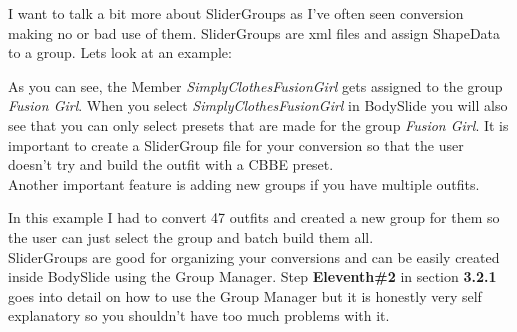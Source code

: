 I want to talk a bit more about SliderGroups as I've often seen conversion making no or bad use of them.
SliderGroups are xml files and assign ShapeData to a group. Lets look at an example:

As you can see, the Member \textit{SimplyClothesFusionGirl} gets assigned to the group \textit{Fusion Girl}. When you select 
\textit{SimplyClothesFusionGirl} in BodySlide you will also see that you can only select presets that are made for the group 
\textit{Fusion Girl}. It is important to create a SliderGroup file for your conversion so that the user doesn't try and 
build the outfit with a CBBE preset.\\
Another important feature is adding new groups if you have multiple outfits.

In this example I had to convert 47 outfits and created a new group for them so the user can just select the group and batch 
build them all.\\ SliderGroups are good for organizing your conversions and can be easily created inside BodySlide using the 
Group Manager. Step \textbf{Eleventh\#2} in section \textbf{3.2.1} goes into detail on how to use the Group Manager but it is 
honestly very self explanatory so you shouldn't have too much problems with it.